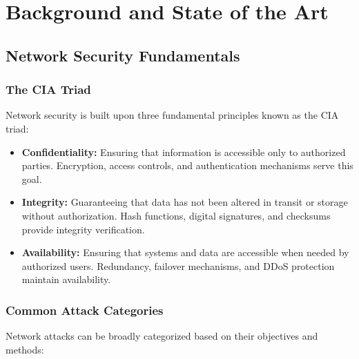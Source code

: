 \documentclass[12pt,a4paper,twoside]{report}
\begin{document}
\chapter{Background and State of the Art}

\section{Network Security Fundamentals}

\subsection{The CIA Triad}

Network security is built upon three fundamental principles known as the CIA triad:

\begin{itemize}
    \item \textbf{Confidentiality:} Ensuring that information is accessible only to authorized parties. Encryption, access controls, and authentication mechanisms serve this goal.
    \item \textbf{Integrity:} Guaranteeing that data has not been altered in transit or storage without authorization. Hash functions, digital signatures, and checksums provide integrity verification.
    \item \textbf{Availability:} Ensuring that systems and data are accessible when needed by authorized users. Redundancy, failover mechanisms, and DDoS protection maintain availability.
\end{itemize}

\subsection{Common Attack Categories}

Network attacks can be broadly categorized based on their objectives and methods:
\end{document}
